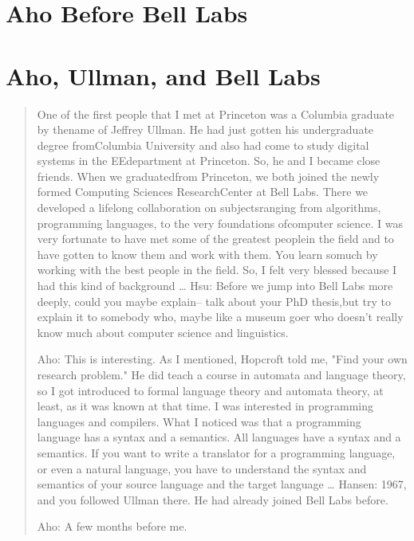 \section{Aho Before Bell Labs}

\section{Aho, Ullman, and Bell Labs}

\begin{quotation}
    One of the first people that I met at Princeton was a Columbia graduate by thename of Jeffrey 
Ullman. He had just gotten his undergraduate degree fromColumbia University and also had come to 
study digital systems in the EEdepartment at Princeton. So, he and I became close friends. When we 
graduatedfrom Princeton, we both joined the newly formed Computing Sciences ResearchCenter at Bell 
Labs. There we developed a lifelong collaboration on subjectsranging from algorithms, programming 
languages, to the very foundations ofcomputer science. I was very fortunate to have met some of the 
greatest peoplein the field and to have gotten to know them and work with them. You learn somuch by 
working with the best people in the field. So, I felt very blessed because I had this kind of 
background
\dots
Hsu: Before we jump into Bell Labs more deeply, could you maybe explain-- talk about your PhD 
thesis,but try to explain it to somebody who, maybe like a museum goer who doesn't really know much 
about computer science and linguistics.

Aho: This is interesting. As I mentioned, Hopcroft told me, "Find your own research problem." He 
did teach a course in automata and language theory, so I got introduced to formal language theory 
and automata theory, at least, as it was known at that time. I was interested in programming 
languages and compilers. What I noticed was that a programming language has a syntax and a 
semantics. All languages have a syntax and a semantics. If you want to write a translator for a 
programming language, or even a natural language, you have to understand the syntax and semantics of 
your source language and the target language
\dots
Hansen: 1967, and you followed Ullman there. He had already joined Bell Labs before.

Aho: A few months before me.


\end{quotation}
